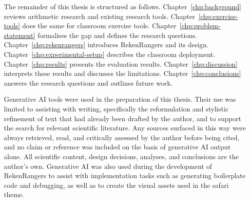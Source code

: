 The remainder of this thesis is structured as follows. Chapter~\ref{chp:background} reviews arithmetic research and existing research tools. Chapter~\ref{chp:exercise-tools} does the same for classroom exercise tools. Chapter~\ref{chp:problem-statement} formalises the gap and defines the research questions. Chapter~\ref{chp:rekenrangers} introduces RekenRangers and its design. Chapter~\ref{chp:experimental-setup} describes the classroom deployment. Chapter~\ref{chp:results} presents the evaluation results. Chapter~\ref{chp:discussion} interprets these results and discusses the limitations. Chapter~\ref{chp:conclusions} answers the research questions and outlines future work.

\vspace{5em}
\noindent
\begin{tcolorbox}[
    colback=gray!5!white,
    colframe=gray!50!black,
    title=Note on the use of generative AI
]
Generative AI tools were used in the preparation of this thesis. Their use was limited to assisting with writing, specifically the reformulation and stylistic refinement of text that had already been drafted by the author, and to support the search for relevant scientific literature. Any sources surfaced in this way were always retrieved, read, and critically assessed by the author before being cited, and no claim or reference was included on the basis of generative AI output alone. All scientific content, design decisions, analyses, and conclusions are the author's own. Generative AI was also used during the development of RekenRangers to assist with implementation tasks such as generating boilerplate code and debugging, as well as to create the visual assets used in the safari theme.
\end{tcolorbox}

